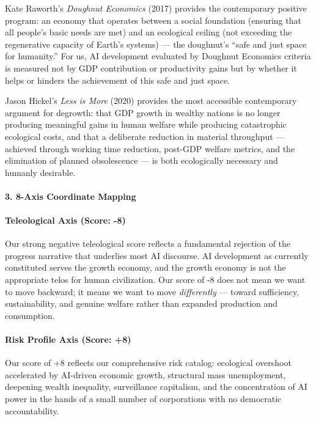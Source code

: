 Kate Raworth's \emph{Doughnut Economics} (2017) provides the
contemporary positive program: an economy that operates between a social
foundation (ensuring that all people's basic needs are met) and an
ecological ceiling (not exceeding the regenerative capacity of Earth's
systems) --- the doughnut's ``safe and just space for humanity.'' For
us, AI development evaluated by Doughnut Economics criteria is measured
not by GDP contribution or productivity gains but by whether it helps or
hinders the achievement of this safe and just space.

Jason Hickel's \emph{Less is More} (2020) provides the most accessible
contemporary argument for degrowth: that GDP growth in wealthy nations
is no longer producing meaningful gains in human welfare while producing
catastrophic ecological costs, and that a deliberate reduction in
material throughput --- achieved through working time reduction,
post-GDP welfare metrics, and the elimination of planned obsolescence
--- is both ecologically necessary and humanly desirable.

\paragraph{3. 8-Axis Coordinate
Mapping}\label{axis-coordinate-mapping-6}

\paragraph{Teleological Axis (Score:
-8)}\label{teleological-axis-score--8}

Our strong negative teleological score reflects a fundamental rejection
of the progress narrative that underlies most AI discourse. AI
development as currently constituted serves the growth economy, and the
growth economy is not the appropriate telos for human civilization. Our
score of -8 does not mean we want to move backward; it means we want to
move \emph{differently} --- toward sufficiency, sustainability, and
genuine welfare rather than expanded production and consumption.

\paragraph{Risk Profile Axis (Score:
+8)}\label{risk-profile-axis-score-8}

Our score of +8 reflects our comprehensive risk catalog: ecological
overshoot accelerated by AI-driven economic growth, structural mass
unemployment, deepening wealth inequality, surveillance capitalism, and
the concentration of AI power in the hands of a small number of
corporations with no democratic accountability.

